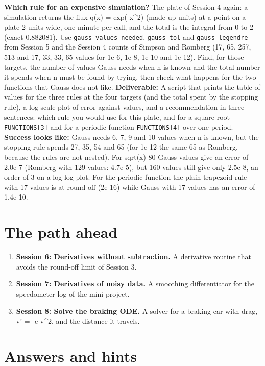 \documentclass[11pt,a4paper]{article}
\begin{document}
\textbf{Which rule for an expensive simulation?} The plate of Session 4 again: a simulation returns the flux q(x) = exp(-x\textasciicircum{}2) (made-up units) at a point on a plate 2 units wide, one minute per call, and the total is the integral from 0 to 2 (exact 0.882081). Use \texttt{gauss\_values\_needed}, \texttt{gauss\_tol} and \texttt{gauss\_legendre} from Session 5 and the Session 4 counts of Simpson and Romberg (17, 65, 257, 513 and 17, 33, 33, 65 values for 1e-6, 1e-8, 1e-10 and 1e-12). Find, for those targets, the number of values Gauss needs when n is known and the total number it spends when n must be found by trying, then check what happens for the two functions that Gauss does not like. \textbf{Deliverable:} A script that prints the table of values for the three rules at the four targets (and the total spent by the stopping rule), a log-scale plot of error against values, and a recommendation in three sentences: which rule you would use for this plate, and for a square root \texttt{FUNCTIONS[3]} and for a periodic function \texttt{FUNCTIONS[4]} over one period. \textbf{Success looks like:} Gauss needs 6, 7, 9 and 10 values when n is known, but the stopping rule spends 27, 35, 54 and 65 (for 1e-12 the same 65 as Romberg, because the rules are not nested). For sqrt(x) 80 Gauss values give an error of 2.0e-7 (Romberg with 129 values: 4.7e-5), but 160 values still give only 2.5e-8, an order of 3 on a log-log plot. For the periodic function the plain trapezoid rule with 17 values is at round-off (2e-16) while Gauss with 17 values has an error of 1.4e-10.

\section{The path ahead}
\begin{enumerate}[nosep]
\item \textbf{Session 6: Derivatives without subtraction.} A derivative routine that avoids the round-off limit of Session 3.
\item \textbf{Session 7: Derivatives of noisy data.} A smoothing differentiator for the speedometer log of the mini-project.
\item \textbf{Session 8: Solve the braking ODE.} A solver for a braking car with drag, v' = -c v\textasciicircum{}2, and the distance it travels.
\end{enumerate}

\section{Answers and hints}
\end{document}

